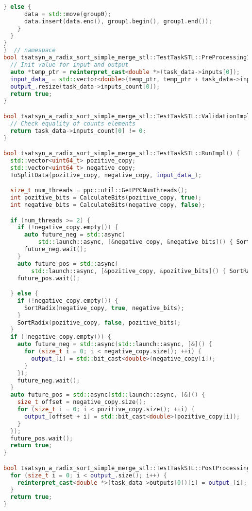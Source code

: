 \documentclass[a4paper,12pt]{article}
\begin{document}
\begin{lstlisting}[language=C++,
    breaklines=true,       % Автоматический перенос строк
    basicstyle=\small\ttfamily, % Уменьшенный шрифт
    columns=fullflexible ]
    } else {
      data = std::move(group0);
      data.insert(data.end(), group1.begin(), group1.end());
    }
  }
}
}  // namespace
bool tsatsyn_a_radix_sort_simple_merge_stl::TestTaskSTL::PreProcessingImpl() {
  // Init value for input and output
  auto *temp_ptr = reinterpret_cast<double *>(task_data->inputs[0]);
  input_data_ = std::vector<double>(temp_ptr, temp_ptr + task_data->inputs_count[0]);
  output_.resize(task_data->inputs_count[0]);
  return true;
}

bool tsatsyn_a_radix_sort_simple_merge_stl::TestTaskSTL::ValidationImpl() {
  // Check equality of counts elements
  return task_data->inputs_count[0] != 0;
}

bool tsatsyn_a_radix_sort_simple_merge_stl::TestTaskSTL::RunImpl() {
  std::vector<uint64_t> pozitive_copy;
  std::vector<uint64_t> negative_copy;
  ToSplitData(pozitive_copy, negative_copy, input_data_);

  size_t num_threads = ppc::util::GetPPCNumThreads();
  int pozitive_bits = CalculateBits(pozitive_copy, true);
  int negative_bits = CalculateBits(negative_copy, false);

  if (num_threads >= 2) {
    if (!negative_copy.empty()) {
      auto future_neg = std::async(
          std::launch::async, [&negative_copy, &negative_bits]() { SortRadix(negative_copy, true, negative_bits); });
      future_neg.wait();
    }
    auto future_pos = std::async(
        std::launch::async, [&pozitive_copy, &pozitive_bits]() { SortRadix(pozitive_copy, false, pozitive_bits); });
    future_pos.wait();

  } else {
    if (!negative_copy.empty()) {
      SortRadix(negative_copy, true, negative_bits);
    }
    SortRadix(pozitive_copy, false, pozitive_bits);
  }
  if (!negative_copy.empty()) {
    auto future_neg = std::async(std::launch::async, [&]() {
      for (size_t i = 0; i < negative_copy.size(); ++i) {
        output_[i] = std::bit_cast<double>(negative_copy[i]);
      }
    });
    future_neg.wait();
  }
  auto future_pos = std::async(std::launch::async, [&]() {
    size_t offset = negative_copy.size();
    for (size_t i = 0; i < pozitive_copy.size(); ++i) {
      output_[offset + i] = std::bit_cast<double>(pozitive_copy[i]);
    }
  });
  future_pos.wait();
  return true;
}

bool tsatsyn_a_radix_sort_simple_merge_stl::TestTaskSTL::PostProcessingImpl() {
  for (size_t i = 0; i < output_.size(); i++) {
    reinterpret_cast<double *>(task_data->outputs[0])[i] = output_[i];
  }
  return true;
}
    \end{lstlisting}
\end{document}
